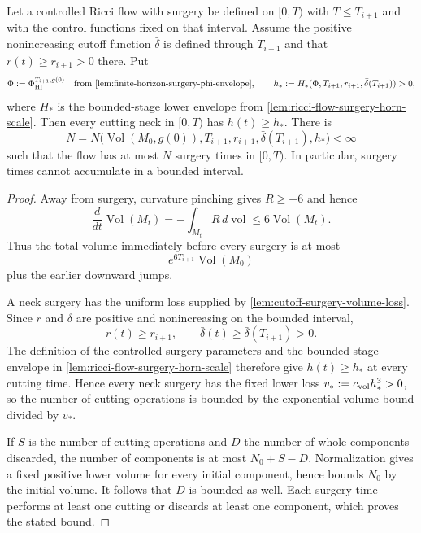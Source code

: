 \begin{theorem}
\label{thm:finite-interval-surgery-bound}
\notready
Let a controlled Ricci flow with surgery be defined on $[0,T)$ with
$T\le T_{i+1}$ and with the control functions fixed on that interval.  Assume
the positive nonincreasing cutoff function $\bar\delta$ is defined through
$T_{i+1}$ and that $r(t)\ge r_{i+1}>0$ there.  Put
\[
 \Phi:=\Phi_{\rm HI}^{T_{i+1},g(0)}
 \quad\text{from \ref{lem:finite-horizon-surgery-phi-envelope}},
 \qquad
 h_*:=H_*(\Phi,T_{i+1},r_{i+1},
              \bar\delta(T_{i+1}))>0,
\]
where $H_*$ is the bounded-stage lower envelope from
\ref{lem:ricci-flow-surgery-horn-scale}.  Then every cutting neck in $[0,T)$
has $h(t)\ge h_*$.  There is
\[
 N=N\bigl(\operatorname{Vol}(M_0,g(0)),T_{i+1},r_{i+1},
             \bar\delta(T_{i+1}),h_*\bigr)<\infty
\]
such that the flow has at most $N$ surgery times in $[0,T)$.  In particular,
surgery times cannot accumulate in a bounded interval.
\end{theorem}

\begin{proof}
Away from surgery, curvature pinching gives $R\ge-6$ and hence
\[
 \frac d{dt}\operatorname{Vol}(M_t)
 =-\int_{M_t}R\,d\operatorname{vol}
 \le6\operatorname{Vol}(M_t).
\]
Thus the total volume immediately before every surgery is at most
\[
 e^{6T_{i+1}}\operatorname{Vol}(M_0)
\]
plus the earlier downward jumps.

A neck surgery has the uniform loss supplied by
\ref{lem:cutoff-surgery-volume-loss}.  Since $r$ and $\bar\delta$ are
positive and nonincreasing on the bounded interval,
\[
 r(t)\ge r_{i+1},\qquad
 \bar\delta(t)\ge\bar\delta(T_{i+1})>0.
\]
The definition of the controlled surgery parameters and the bounded-stage
envelope in \ref{lem:ricci-flow-surgery-horn-scale} therefore give
$h(t)\ge h_*$ at every cutting time.  Hence every neck surgery has the fixed
lower loss $v_*:=c_{\rm vol}h_*^3>0$, so
the number of cutting operations is bounded by the exponential volume bound
divided by $v_*$.

If $S$ is the number of cutting operations and $D$ the number of whole
components discarded, the number of components is at most $N_0+S-D$.
Normalization gives a fixed positive lower volume for every initial
component, hence bounds $N_0$ by the initial volume.  It follows that $D$ is
bounded as well.  Each surgery time performs at least one cutting or discards
at least one component, which proves the stated bound.
\end{proof}

